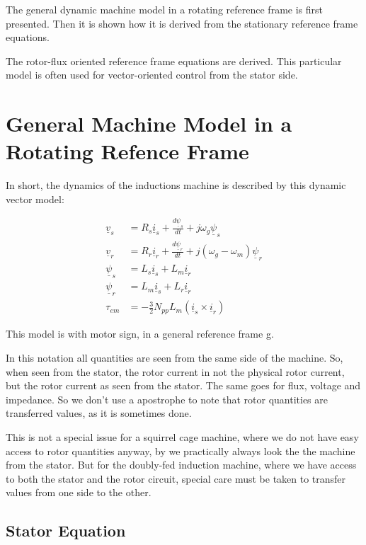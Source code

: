 \documentclass[]{book}
\begin{document}
The general dynamic machine model in a rotating reference frame is first presented. Then it is shown how it is derived from the stationary reference frame equations.

The rotor-flux oriented reference frame equations are derived. This particular model is often used for vector-oriented control from the stator side.

\hypertarget{general-machine-model-in-a-rotating-refence-frame}{%
\section{General Machine Model in a Rotating Refence Frame}\label{general-machine-model-in-a-rotating-refence-frame}}

In short, the dynamics of the inductions machine is described by this dynamic vector model:

\[
\begin{aligned}
\underline{v}_s & = R_s \underline{i}_s + \frac{d\underline{\psi}_s}{dt} + j \omega_g \underline{\psi}_s  \\
\underline{v}_r & = R_r \underline{i}_r + \frac{d\underline{\psi}_r}{dt} + j (\omega_g-\omega_m) \underline{\psi}_r \\
\underline{\psi}_s & = L_s \underline{i}_s + L_m \underline{i}_r\\
\underline{\psi}_r & = L_m \underline{i}_s + L_r \underline{i}_r\\
\tau_{em} &= - \frac{3}{2}N_{pp}L_m(\underline{i}_s  \times \underline{i}_r)
\end{aligned}
\label{eq:genDqMdl}
\]

This model is with motor sign, in a general reference frame g.

In this notation all quantities are seen from the same side of the machine. So, when seen from the stator, the rotor current in not the physical rotor current, but the rotor current as seen from the stator. The same goes for flux, voltage and impedance. So we don't use a apostrophe to note that rotor quantities are transferred values, as it is sometimes done.

This is not a special issue for a squirrel cage machine, where we do not have easy access to rotor quantities anyway, by we practically always look the the machine from the stator. But for the doubly-fed induction machine, where we have access to both the stator and the rotor circuit, special care must be taken to transfer values from one side to the other.

\hypertarget{stator-equation}{%
\subsection{Stator Equation}\label{stator-equation}}
\end{document}
